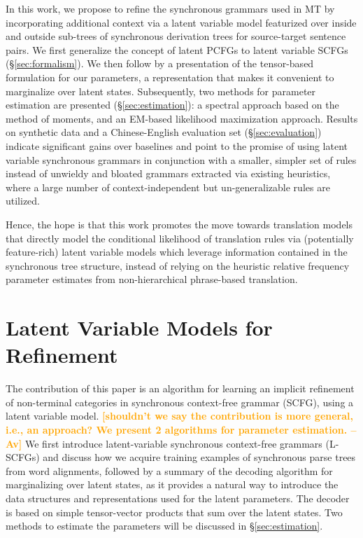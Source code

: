 \documentclass[11pt]{article}
\newcommand{\avcomment}[1]{\textcolor{orange}{\textbf{[#1 -- Av]}}}
\begin{document}
In this work, we propose to refine the synchronous grammars used in MT by incorporating additional context via a latent variable model featurized over inside and outside sub-trees of synchronous derivation trees for source-target sentence pairs.  
We first generalize the concept of latent PCFGs to latent variable SCFGs (\S\ref{sec:formalism}). We then follow by a presentation of the tensor-based formulation for our parameters, a representation that makes it convenient to marginalize over latent states.  
Subsequently, two methods for parameter estimation are presented (\S\ref{sec:estimation}): a spectral approach based on the method of moments, and an EM-based likelihood maximization approach.  
Results on synthetic data and a Chinese-English evaluation set (\S\ref{sec:evaluation}) indicate significant gains over baselines and point to the promise of using latent variable synchronous grammars in conjunction with a smaller, simpler set of rules instead of unwieldy and bloated grammars extracted via existing heuristics, where a large number of context-independent but un-generalizable rules are utilized.  

Hence, the hope is that this work promotes the move towards translation models that directly model the conditional likelihood of translation rules via (potentially feature-rich) latent variable models which leverage information contained in the synchronous tree structure, instead of relying on the heuristic relative frequency parameter estimates \cite{Koehn2003} from non-hierarchical phrase-based translation.  

\section{Latent Variable Models for Refinement}
The contribution of this paper is an algorithm for learning an implicit refinement of non-terminal categories in synchronous context-free grammar (SCFG), using a latent variable model.  
\avcomment{shouldn't we say the contribution is more general, i.e., an approach? We present 2 algorithms for parameter estimation.}
We first introduce latent-variable synchronous context-free grammars (L-SCFGs) and discuss how we acquire training examples of synchronous parse trees from word alignments, followed by a summary of the decoding algorithm for marginalizing over latent states, as it provides a natural way to introduce the data structures and representations used for the latent parameters.  
The decoder is based on simple tensor-vector products that sum over the latent states.  
Two methods to estimate the parameters will be discussed in \S\ref{sec:estimation}. 
\end{document}
